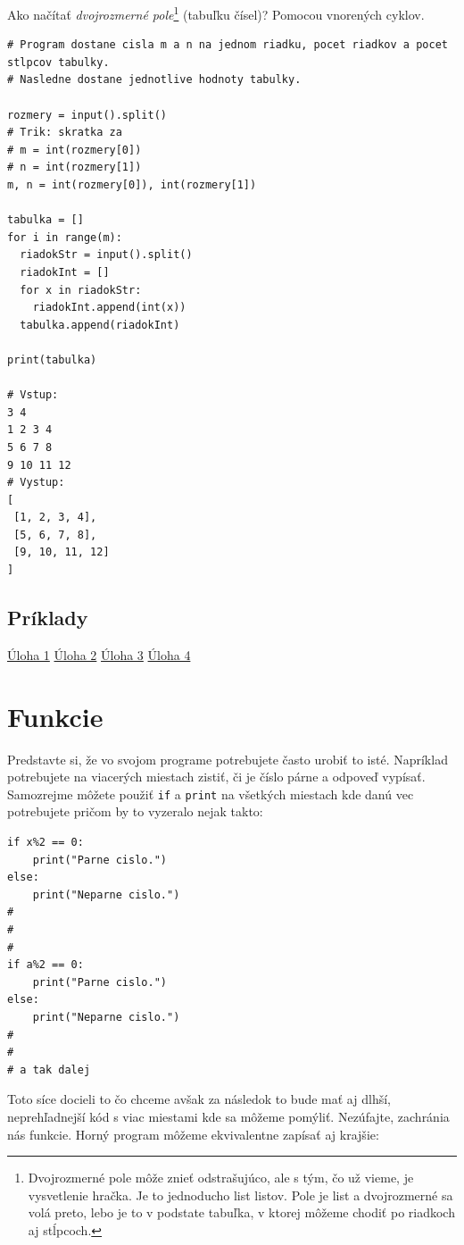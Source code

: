 \documentclass{article}
\begin{document}
Ako načítať \textit{dvojrozmerné pole}\footnote{Dvojrozmerné pole môže znieť odstrašujúco, ale s tým, čo už vieme, je vysvetlenie hračka. Je to jednoducho list listov. Pole je list a dvojrozmerné sa volá preto, lebo je to v podstate tabuľka, v ktorej môžeme chodiť po riadkoch aj stĺpcoch.} (tabuľku čísel)? Pomocou vnorených cyklov.
\begin{lstlisting}
# Program dostane cisla m a n na jednom riadku, pocet riadkov a pocet stlpcov tabulky.
# Nasledne dostane jednotlive hodnoty tabulky.

rozmery = input().split()
# Trik: skratka za
# m = int(rozmery[0])
# n = int(rozmery[1])
m, n = int(rozmery[0]), int(rozmery[1])

tabulka = []
for i in range(m):
  riadokStr = input().split()
  riadokInt = []
  for x in riadokStr:
    riadokInt.append(int(x))
  tabulka.append(riadokInt)

print(tabulka)

# Vstup:
3 4
1 2 3 4
5 6 7 8
9 10 11 12
# Vystup:
[
 [1, 2, 3, 4],
 [5, 6, 7, 8],
 [9, 10, 11, 12]
]
\end{lstlisting}

\subsection{Príklady}
\href{https://testovac.ksp.sk/tasks/ls-uvod-rozdiel/}{Úloha 1}
\href{https://testovac.ksp.sk/tasks/ls-uvod-suctovapyramida/}{Úloha 2}
\href{https://testovac.ksp.sk/tasks/ls-uvod-vymena/}{Úloha 3}
\href{https://testovac.ksp.sk/tasks/ls-uvod-otocenie/}{Úloha 4}

\section{Funkcie}

Predstavte si, že vo svojom programe potrebujete často urobiť to isté. Napríklad potrebujete na viacerých miestach zistiť, či je číslo párne a odpoveď vypísať. Samozrejme môžete použiť \texttt{if} a \texttt{print} na všetkých miestach kde danú vec potrebujete pričom by to vyzeralo nejak takto:

\begin{lstlisting}
if x%2 == 0:
    print("Parne cislo.")
else:
    print("Neparne cislo.")
#   
#
#
if a%2 == 0:
    print("Parne cislo.")
else:
    print("Neparne cislo.")
#
#
# a tak dalej
\end{lstlisting}

Toto síce docieli to čo chceme avšak za následok to bude mať aj dlhší, neprehľadnejší kód s viac miestami kde sa môžeme pomýliť. Nezúfajte, zachránia nás funkcie. Horný program môžeme ekvivalentne zapísať aj krajšie:
\end{document}
